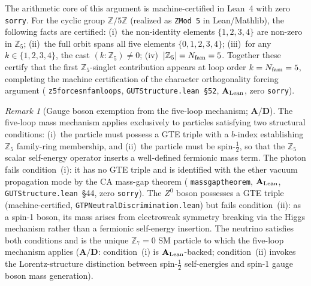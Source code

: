 \documentclass[11pt]{article}
\theoremstyle{remark}
\newtheorem{remark}[theorem]{Remark}
\newcommand{\Nfam}{N_{\rm fam}}
\newcommand{\lean}[1]{%
  \penalty-100
  \begingroup\def\_{\textunderscore\allowbreak}\texttt{#1}\endgroup}
\newcommand{\CatAL}{\ensuremath{\textbf{A}_{\rm Lean}}}
\newcommand{\CatAD}{\textbf{A/D}}
\begin{document}
The arithmetic core of this argument is machine-certified in Lean~4 with zero
\texttt{sorry}.
For the cyclic group $\mathbb{Z}/5\mathbb{Z}$ (realized as \lean{ZMod 5}
in Lean/Mathlib), the following facts are certified:
(i)~the non-identity elements $\{1,2,3,4\}$ are non-zero in $\mathbb{Z}_5$;
(ii)~the full orbit spans all five elements $\{0,1,2,3,4\}$;
(iii)~for any $k \in \{1,2,3,4\}$, the cast $(k \colon \mathbb{Z}_5) \neq 0$;
(iv)~$|\mathbb{Z}_5| = \Nfam = 5$.
Together these certify that the first $\mathbb{Z}_5$-singlet contribution appears at
loop order $k = \Nfam = 5$, completing the machine certification of the character
orthogonality forcing argument
(\lean{z5\_forces\_nfam\_loops}, \texttt{GUTStructure.lean~\S52}, $\CatAL$,
zero \texttt{sorry}).

\begin{remark}[Gauge boson exemption from the five-loop mechanism; $\CatAD$]
\label{rem:gauge_boson_5loop_exempt}
The five-loop mass mechanism applies exclusively to particles satisfying two structural
conditions: (i)~the particle must possess a GTE triple with a $b$-index establishing
$\mathbb{Z}_5$ family-ring membership, and (ii)~the particle must be spin-$\tfrac{1}{2}$,
so that the $\mathbb{Z}_5$ scalar self-energy operator inserts a well-defined fermionic
mass term.
The photon fails condition~(i): it has no GTE triple and is identified with the ether
vacuum propagation mode by the CA mass-gap theorem
(\lean{mass\_gap\_theorem}, $\CatAL$, \texttt{GUTStructure.lean}~\S44, zero \texttt{sorry}).
The $Z^0$ boson possesses a GTE triple (machine-certified,
\texttt{GTPNeutralDiscrimination.lean}) but fails condition~(ii): as a spin-1 boson,
its mass arises from electroweak symmetry breaking via the Higgs mechanism rather than a
fermionic self-energy insertion.
The neutrino satisfies both conditions and is the unique $\mathbb{Z}_7 = 0$ SM particle
to which the five-loop mechanism applies
($\CatAD$: condition~(i) is $\CatAL$-backed; condition~(ii) invokes the
Lorentz-structure distinction between spin-$\tfrac{1}{2}$ self-energies and spin-1
gauge boson mass generation).
\end{remark}
\end{document}
